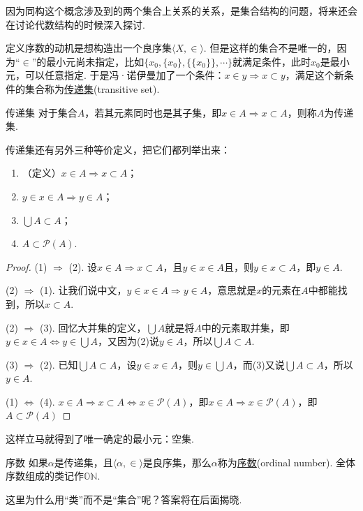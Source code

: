 因为同构这个概念涉及到的两个集合上关系的关系，是集合结构的问题，将来还会在讨论代数结构的时候深入探讨.

定义序数的动机是想构造出一个良序集\(\langle X,\in \rangle\). 但是这样的集合不是唯一的，因为“$\in$”的最小元尚未指定，比如\(\{x_0,\{x_0\},\{\{x_0\}\}, \cdots\}\)就满足条件，此时\(x_0\)是最小元，可以任意指定. 于是冯·诺伊曼加了一个条件：\(x \in y \Rightarrow x \subset y\)，满足这个新条件的集合称为\underline{传递集}(transitive set). 

\begin{definition}{传递集}
    对于集合$A$，若其元素同时也是其子集，即$x \in A \Rightarrow x \subset A$，则称$A$为传递集.
\end{definition}

传递集还有另外三种等价定义，把它们都列举出来：
\begin{enumerate}
    \item （定义）$x \in A \Rightarrow x \subset A$；
    \item $y \in x \in A \Rightarrow y \in A$；
    \item $\bigcup A \subset A$；
    \item $A \subset \mathcal{P}(A)$.
\end{enumerate}

\begin{proof}

    (1) $\Rightarrow$ (2). 设$x \in A \Rightarrow x \subset A$，且$y \in x \in A$且，则$y \in x \subset A$，即$y \in A$.

    (2) $\Rightarrow$ (1). 让我们说中文，$y \in x \in A \Rightarrow y \in A$，意思就是$x$的元素在$A$中都能找到，所以$x \subset A$.

    (2) $\Rightarrow$ (3). 回忆大并集的定义，$\bigcup A$就是将$A$中的元素取并集，即$y \in x \in A \Leftrightarrow y \in \bigcup A$，又因为(2)说$y \in A$，所以$\bigcup A \subset A$.

    (3) $\Rightarrow$ (2). 已知$\bigcup A \subset A$，设$y \in x \in A$，则$y \in \bigcup A$，而(3)又说$\bigcup A \subset A$，所以$y \in A$.

    (1) $\Leftrightarrow$ (4). $x \in A \Rightarrow x \subset A \Leftrightarrow x \in \mathcal{P}(A)$，即$x \in A \Rightarrow x \in \mathcal{P}(A)$，即$A \subset \mathcal{P}(A)$
\end{proof}

这样立马就得到了唯一确定的最小元：空集.

\begin{definition}{序数}
    如果\(\alpha\)是传递集，且\(\langle \alpha,\in \rangle\)是良序集，那么\(\alpha\)称为\underline{序数}(ordinal number). 全体序数组成的类记作\(\mathbb{ON}\).
\end{definition}
这里为什么用“类”而不是“集合”呢？答案将在后面揭晓.

